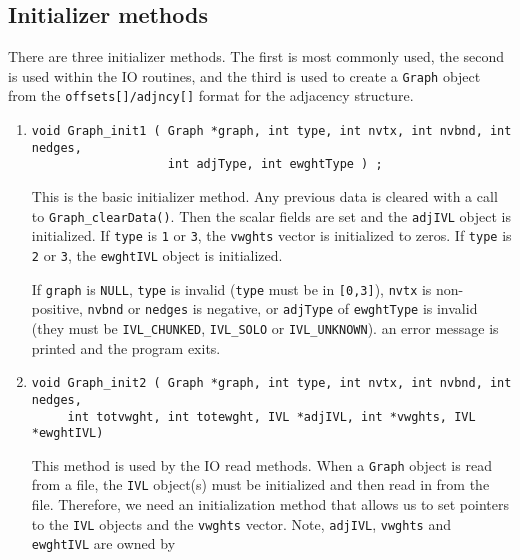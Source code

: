 \subsection{Initializer methods}
\label{subsection:Graph:proto:initializers}
\par
There are three initializer methods.
The first is most commonly used, the second is used within the IO
routines, and the third is used to create a {\tt Graph} object from
the {\tt offsets[]/adjncy[]} format for the adjacency structure.
\par
\begin{enumerate}
\item
\begin{verbatim}
void Graph_init1 ( Graph *graph, int type, int nvtx, int nvbnd, int nedges,
                   int adjType, int ewghtType ) ;
\end{verbatim}
This is the basic initializer method.
Any previous data is cleared with a call to {\tt Graph\_clearData()}.
Then the scalar fields are set and the {\tt adjIVL} object is
initialized.
If {\tt type} is {\tt 1} or {\tt 3}, the {\tt vwghts} vector is
initialized to zeros.
If {\tt type} is {\tt 2} or {\tt 3}, the {\tt ewghtIVL} object
is initialized.
\par {}
If {\tt graph} is {\tt NULL},
{\tt type} is invalid ({\tt type} must be in {\tt [0,3]}),
{\tt nvtx} is non-positive,
{\tt nvbnd} or {\tt nedges} is negative, or
{\tt adjType} of {\tt ewghtType} is invalid (they must be
{\tt IVL\_CHUNKED},
{\tt IVL\_SOLO} or
{\tt IVL\_UNKNOWN}).
an error message is printed and the program exits.
\item
\begin{verbatim}
void Graph_init2 ( Graph *graph, int type, int nvtx, int nvbnd, int nedges,
     int totvwght, int totewght, IVL *adjIVL, int *vwghts, IVL *ewghtIVL)
\end{verbatim}
This method is used by the IO read methods.
When a {\tt Graph} object is read from a file, the {\tt IVL}
object(s) must be initialized and then read in from the file.
Therefore, we need an initialization method that allows us to set
pointers to the {\tt IVL} objects and the {\tt vwghts} vector.
Note, {\tt adjIVL}, {\tt vwghts} and {\tt ewghtIVL} are owned by

\end{enumerate}
